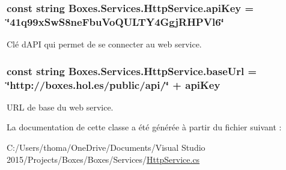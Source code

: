 \subsubsection[{\texorpdfstring{api\+Key}{apiKey}}]{\setlength{\rightskip}{0pt plus 5cm}const string Boxes.\+Services.\+Http\+Service.\+api\+Key = \char`\"{}41q99x\+Sw\+S8ne\+Fbu\+Vo\+Q\+U\+L\+T\+Y4\+Ggj\+R\+H\+P\+Vl6\char`\"{}\hspace{0.3cm}{\ttfamily [private]}}\hypertarget{class_boxes_1_1_services_1_1_http_service_a4f422d76e5a21603d2b9531fa6d7704a}{}\label{class_boxes_1_1_services_1_1_http_service_a4f422d76e5a21603d2b9531fa6d7704a}


Clé d\textquotesingle{}A\+PI qui permet de se connecter au web service. 

\subsubsection[{\texorpdfstring{base\+Url}{baseUrl}}]{\setlength{\rightskip}{0pt plus 5cm}const string Boxes.\+Services.\+Http\+Service.\+base\+Url = \char`\"{}http\+://boxes.\+hol.\+es/public/api/\char`\"{} + api\+Key\hspace{0.3cm}{\ttfamily [private]}}\hypertarget{class_boxes_1_1_services_1_1_http_service_a3a5a8c4bbef22defc61fed8d9b8ec3f7}{}\label{class_boxes_1_1_services_1_1_http_service_a3a5a8c4bbef22defc61fed8d9b8ec3f7}


U\+RL de base du web service. 



La documentation de cette classe a été générée à partir du fichier suivant \+:\begin{DoxyCompactItemize}
\item 
C\+:/\+Users/thoma/\+One\+Drive/\+Documents/\+Visual Studio 2015/\+Projects/\+Boxes/\+Boxes/\+Services/\hyperlink{_http_service_8cs}{Http\+Service.\+cs}\end{DoxyCompactItemize}

